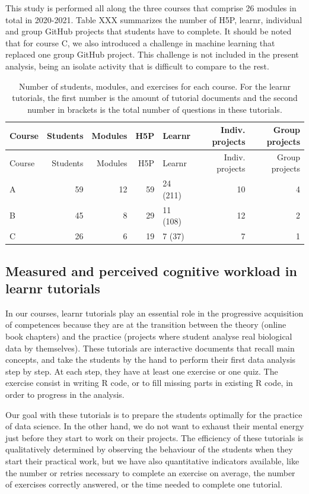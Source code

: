 \documentclass[
]{article}
\begin{document}
This study is performed all along the three courses that comprise 26
modules in total in 2020-2021. Table XXX summarizes the number of H5P,
learnr, individual and group GitHub projects that students have to
complete. It should be noted that for course C, we also introduced a
challenge in machine learning that replaced one group GitHub project.
This challenge is not included in the present analysis, being an isolate
activity that is difficult to compare to the rest.

\begin{longtable}[]{@{}lrrrlrr@{}}
\caption{Number of students, modules, and exercises for each course. For
the learnr tutorials, the first number is the amount of tutorial
documents and the second number in brackets is the total number of
questions in these tutorials.}\tabularnewline
\toprule
Course & Students & Modules & H5P & Learnr & Indiv. projects & Group
projects \\
\midrule
\endfirsthead
\toprule
Course & Students & Modules & H5P & Learnr & Indiv. projects & Group
projects \\
\midrule
\endhead
A & 59 & 12 & 59 & 24 (211) & 10 & 4 \\
B & 45 & 8 & 29 & 11 (108) & 12 & 2 \\
C & 26 & 6 & 19 & 7 (37) & 7 & 1 \\
\bottomrule
\end{longtable}

\hypertarget{measured-and-perceived-cognitive-workload-in-learnr-tutorials}{%
\subsection{Measured and perceived cognitive workload in learnr
tutorials}\label{measured-and-perceived-cognitive-workload-in-learnr-tutorials}}

In our courses, learnr tutorials play an essential role in the
progressive acquisition of competences because they are at the
transition between the theory (online book chapters) and the practice
(projects where student analyse real biological data by themselves).
These tutorials are interactive documents that recall main concepts, and
take the students by the hand to perform their first data analysis step
by step. At each step, they have at least one exercise or one quiz. The
exercise consist in writing R code, or to fill missing parts in existing
R code, in order to progress in the analysis.

Our goal with these tutorials is to prepare the students optimally for
the practice of data science. In the other hand, we do not want to
exhaust their mental energy just before they start to work on their
projects. The efficiency of these tutorials is qualitatively determined
by observing the behaviour of the students when they start their
practical work, but we have also quantitative indicators available, like
the number or retries necessary to complete an exercise on average, the
number of exercises correctly answered, or the time needed to complete
one tutorial.
\end{document}

